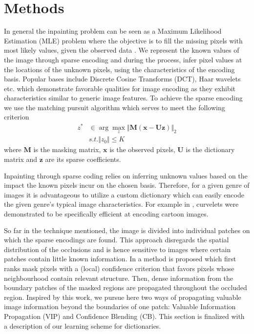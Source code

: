 \section{Methods}
\label{sec:methods}

In general the inpainting problem can be seen as a Maximum Likelihood Estimation (MLE) problem where the objective is to fill the missing pixels with most likely values, given the observed data \cite{fadili2009inpainting}. We represent the known values of the image through sparse encoding and during the process, infer pixel values at the locations of the unknown pixels, using the characteristics of the encoding basis. Popular bases include Discrete Cosine Transforms (DCT), Haar wavelets etc. which demonstrate favorable qualities for image encoding as they exhibit characteristics similar to generic image features. To achieve the sparse encoding we use the matching pursuit algorithm which serves to meet the following criterion 
\begin{align*}
   z^* &\in \arg\max_{z} \Vert\mathbf{M}(\mathbf{x}-\mathbf{U}\mathbf{z}) \Vert_2 \\
   		& s.t. \Vert z_0\Vert  \leqslant K
\end{align*}
where $\mathbf{M}$ is the masking matrix, $\mathbf{x}$ is the observed pixels, $\mathbf{U}$ is the dictionary matrix and $\mathbf{z}$ are its sparse coefficients. \cite{CIL2015}



Inpainting through sparse coding relies on inferring unknown values based on the impact the known pixels incur on the chosen basis. Therefore, for a given genre of images it is advantageous to utilize a custom dictionary which can easily encode the given genre's typical image characteristics. For example  in \cite{elad2005simultaneous}, curvelets were demonstrated to be specifically efficient at encoding cartoon images.

So far in the technique mentioned, the image is divided into individual patches on which the sparse encodings are found. This approach disregards the spatial distribution of the occlusions and is hence sensitive to images where certain patches contain little known information. In \cite{criminisi2004region} a method is proposed which first ranks mask pixels with a (local) confidence criterion that favors pixels whose neighbourhood contain relevant structure. Then, dense information from the boundary patches of the masked regions are propagated throughout the occluded region. Inspired by this work, we pursue here two ways of propagating valuable image information beyond the boundaries of one patch: Valuable Information Propagation (VIP) and Confidence Blending (CB). This section is finalized with a description of our learning scheme for dictionaries.

